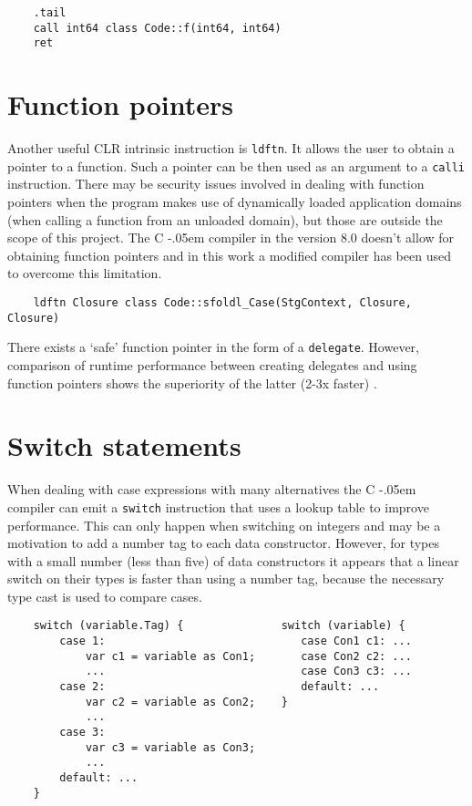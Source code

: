 \documentclass[en]{pracamgr}
\newcommand{\shrp}{%
  {\settoheight{\dimen0}{C}\kern-.05em \resizebox{!}{\dimen0}{\raisebox{\depth}{\textbf{\#}}}\hspace{1ex}}}
\begin{document}
\begin{verbatim}
    .tail
    call int64 class Code::f(int64, int64)
    ret
\end{verbatim}

\section{Function pointers}

Another useful CLR intrinsic instruction is \texttt{ldftn}.
It allows the user to obtain a pointer to a function.
Such a pointer can be then used as an argument to a
 \texttt{calli} instruction.
There may be security issues involved in dealing with function
pointers when the program makes use of dynamically loaded application
domains (when calling a function from an unloaded domain), but
those are outside the scope of this project.
The C\shrp compiler in the version 8.0 doesn't allow for obtaining
function pointers and in this work a modified compiler has been used
to overcome this limitation.

\begin{verbatim}
    ldftn Closure class Code::sfoldl_Case(StgContext, Closure, Closure)
\end{verbatim}

There exists a `safe' function pointer in the form of a \texttt{delegate}.
However, comparison of runtime performance between creating delegates and
using function pointers shows the superiority of the latter (2-3x faster)
\cite{ldftnVSdelegate}.

\section{Switch statements}

When dealing with case expressions with many alternatives the C\shrp compiler
can emit a \texttt{switch} instruction that uses a lookup table to improve
performance. This can only happen when switching on integers and may be
a motivation to add a number tag to each data constructor.
However, for types with a small number (less than five) of
data constructors it appears that a linear switch on their types is faster
than using a number tag, because the necessary type cast is used
to compare cases.

\begin{verbatim}
    switch (variable.Tag) {               switch (variable) {
        case 1:                              case Con1 c1: ...
            var c1 = variable as Con1;       case Con2 c2: ...
            ...                              case Con3 c3: ...
        case 2:                              default: ...
            var c2 = variable as Con2;    }
            ...
        case 3: 
            var c3 = variable as Con3;
            ...
        default: ...
    }
\end{verbatim}
\end{document}
